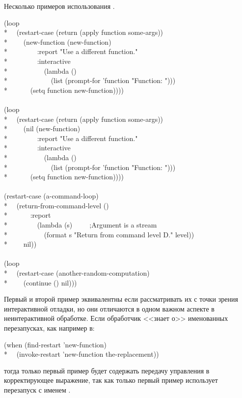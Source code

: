 \begin{defmac}
Несколько примеров использования .
\begin{lisp}
(loop \\*
~~(restart-case (return (apply function some-args)) \\*
~~~~(new-function (new-function) \\*
~~~~~~~~:report "Use a different function." \\*
~~~~~~~~:interactive \\*
~~~~~~~~~~(lambda () \\*
~~~~~~~~~~~~(list (prompt-for 'function "Function: "))) \\*
~~~~~~(setq function new-function)))) \\
 \\
(loop \\*
~~(restart-case (return (apply function some-args)) \\*
~~~~(nil (new-function) \\*
~~~~~~~~:report "Use a different function." \\*
~~~~~~~~:interactive \\*
~~~~~~~~~~(lambda () \\*
~~~~~~~~~~~~(list (prompt-for 'function "Function: "))) \\*
~~~~~~(setq function new-function)))) \\
 \\
(restart-case (a-command-loop) \\*
~~(return-from-command-level () \\*
~~~~~~:report \\*
~~~~~~~~(lambda (s)~~~~~;\textrm{Argument  is a stream} \\*
~~~~~~~~~~(format s "Return from command level {\Xtilde}D." level)) \\*
~~~~nil)) \\
 \\
(loop  \\*
~~(restart-case (another-random-computation) \\*
~~~~(continue () nil)))
\end{lisp}
Первый и второй пример эквивалентны если рассматривать их с точки зрения
интерактивной отладки, но они отличаются в одном важном аспекте в
неинтерактивной обработке. Если обработчик <<знает о>> именованных перезапусках,
как например в:
\begin{lisp}
(when (find-restart 'new-function) \\*
~~(invoke-restart 'new-function the-replacement))
\end{lisp}
тогда только первый пример будет содержать передачу управления в корректирующее
выражение, так как только первый пример использует перезапуск с именем
.


\end{defmac}

